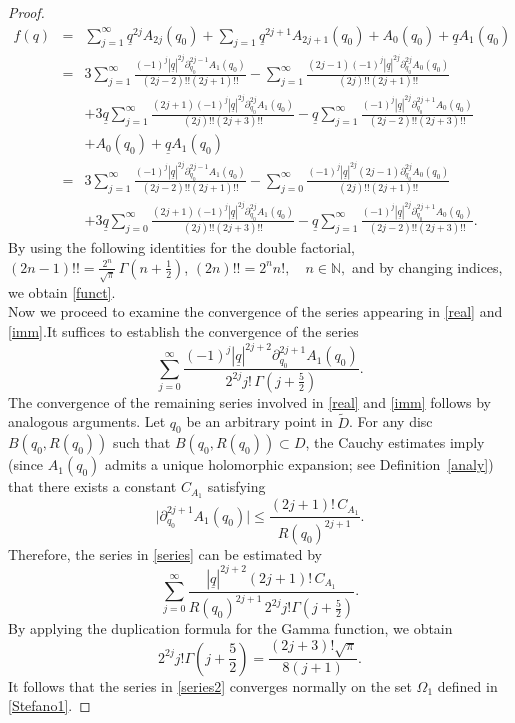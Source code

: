 \documentclass[reqno,11pt]{amsart}
\numberwithin{equation}{section}
\theoremstyle{definition}
\begin{document}
\begin{proof}
\begin{eqnarray*}
	\nonumber
f(q)&=& \sum_{j=1}^\infty \underline{q}^{2j}A_{2j}(q_0)+ \sum_{j=1} \underline{q}^{2j+1} A_{2j+1}(q_0)+A_0(q_0)+ \underline{q}A_1(q_0)\\
\nonumber
&=& 3\sum_{j=1}^\infty \frac{(-1)^j |\underline{q}|^{2j} \partial_{q_0}^{2j-1}A_1(q_0)}{(2j-2)!! (2j+1)!!}- \sum_{j=1}^\infty \frac{(2j-1)(-1)^j | \underline{q}|^{2j} \partial_{q_0}^{2j}A_0(q_0)}{(2j)!! (2j+1)!!}\\
\nonumber
&&+3 \underline{q} \sum_{j=1}^\infty \frac{(2j+1) (-1)^j | \underline{q}|^{2j} \partial_{q_0}^{2j}A_1(q_0)}{(2j)!!(2j+3)!!}- \underline{q} \sum_{j=1}^\infty \frac{(-1)^j | \underline{q}|^{2j} \partial_{q_0}^{2j+1} A_0(q_0)}{(2j-2)!! (2j+3)!!}\\
\nonumber
&& +A_0(q_0)+ \underline{q}A_1(q_0)\\
\nonumber
&=&  3\sum_{j=1}^\infty \frac{(-1)^j |\underline{q}|^{2j} \partial_{q_0}^{2j-1}A_1(q_0)}{(2j-2)!! (2j+1)!!}- \sum_{j=0}^\infty \frac{(-1)^j | \underline{q}|^{2j}(2j-1) \partial_{q_0}^{2j}A_0(q_0)}{(2j)!! (2j+1)!!}\\
\label{starS}
&&+3 \underline{q} \sum_{j=0}^\infty \frac{(2j+1) (-1)^j | \underline{q}|^{2j} \partial_{q_0}^{2j}A_1(q_0)}{(2j)!!(2j+3)!!}- \underline{q} \sum_{j=1}^\infty \frac{(-1)^j | \underline{q}|^{2j} \partial_{q_0}^{2j+1} A_0(q_0)}{(2j-2)!! (2j+3)!!}.
\end{eqnarray*}
By using the following identities for the double factorial, $(2n-1)!!=\frac{2^n}{\sqrt{\pi}}\,\Gamma\!\left(n+\tfrac{1}{2}\right)$, $(2n)!!=2^n n!,
\quad n\in\mathbb{N},$
and by changing indices, we obtain \eqref{funct}.
\\Now we proceed to examine the convergence of the series appearing in \eqref{real} and \eqref{imm}.It suffices to establish the convergence of the series
\begin{equation}
	\label{series}
	\sum_{j=0}^{\infty}
	\frac{(-1)^j |\underline{q}|^{2j+2} \partial_{q_0}^{2j+1} A_1(q_0)}
	{2^{2j} j!\, \Gamma\!\left(j+\frac{5}{2}\right)}.
\end{equation}
The convergence of the remaining series involved in \eqref{real} and \eqref{imm} follows by analogous arguments. Let $q_0$ be an arbitrary point in $\widetilde{D}$. For any disc $B(q_0,R(q_0))$ such that $B(q_0,R(q_0))\subset D$, the Cauchy estimates imply (since $A_1(q_0)$ admits a unique holomorphic expansion; see Definition~\ref{analy}) that there exists a constant $C_{A_1}$ satisfying
$$
\bigl|\partial_{q_0}^{2j+1}A_1(q_0)\bigr|
\leq
\frac{(2j+1)!\,C_{A_1}}{R(q_0)^{2j+1}}.
$$
Therefore, the series in \eqref{series} can be estimated by
\begin{equation}
	\label{series2}
	\sum_{j=0}^{\infty}
	\frac{|\underline{q}|^{2j+2}(2j+1)!\,C_{A_1}}
	{R(q_0)^{2j+1}\,2^{2j}j!\Gamma\!\left(j+\frac{5}{2}\right)}.
\end{equation}
By applying the duplication formula for the Gamma function, we obtain
$$
2^{2j}j!\Gamma\!\left(j+\frac{5}{2}\right)= \frac{(2j+3)! \sqrt{\pi}}{8(j+1)}.
$$
It follows that the series in \eqref{series2} converges normally on the set $\Omega_1$ defined in \eqref{Stefano1}.
\end{proof}
\end{document}
